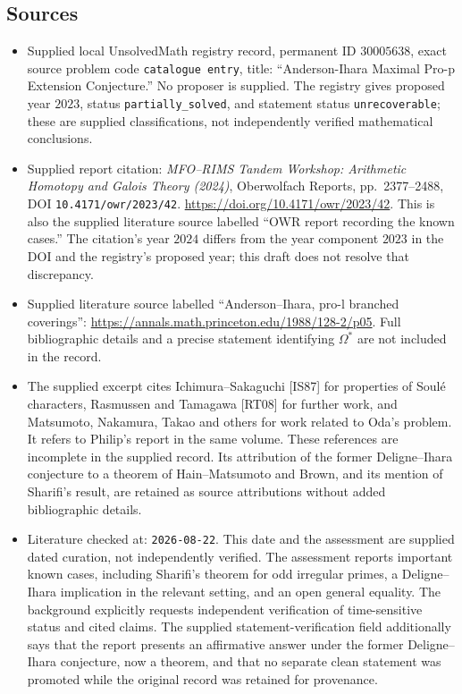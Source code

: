 \documentclass[11pt]{article}
\begin{document}
\subsection{Sources}
\begin{itemize}
\item Supplied local UnsolvedMath registry record, permanent ID \(30005638\), exact source problem code \texttt{catalogue entry}, title: ``Anderson-Ihara Maximal Pro-p Extension Conjecture.'' No proposer is supplied. The registry gives proposed year \(2023\), status \texttt{partially\_solved}, and statement status \texttt{unrecoverable}; these are supplied classifications, not independently verified mathematical conclusions.
\item Supplied report citation: \emph{MFO--RIMS Tandem Workshop: Arithmetic Homotopy and Galois Theory (2024)}, Oberwolfach Reports, pp.\ 2377--2488, DOI \texttt{10.4171/owr/2023/42}. \url{https://doi.org/10.4171/owr/2023/42}. This is also the supplied literature source labelled ``OWR report recording the known cases.'' The citation's year \(2024\) differs from the year component \(2023\) in the DOI and the registry's proposed year; this draft does not resolve that discrepancy.
\item Supplied literature source labelled ``Anderson--Ihara, pro-l branched coverings'': \url{https://annals.math.princeton.edu/1988/128-2/p05}. Full bibliographic details and a precise statement identifying \(\Omega^{*}\) are not included in the record.
\item The supplied excerpt cites Ichimura--Sakaguchi [IS87] for properties of Soul\'e characters, Rasmussen and Tamagawa [RT08] for further work, and Matsumoto, Nakamura, Takao and others for work related to Oda's problem. It refers to Philip's report in the same volume. These references are incomplete in the supplied record. Its attribution of the former Deligne--Ihara conjecture to a theorem of Hain--Matsumoto and Brown, and its mention of Sharifi's result, are retained as source attributions without added bibliographic details.
\item Literature checked at: \texttt{2026-08-22}. This date and the assessment are supplied dated curation, not independently verified. The assessment reports important known cases, including Sharifi's theorem for odd irregular primes, a Deligne--Ihara implication in the relevant setting, and an open general equality. The background explicitly requests independent verification of time-sensitive status and cited claims. The supplied statement-verification field additionally says that the report presents an affirmative answer under the former Deligne--Ihara conjecture, now a theorem, and that no separate clean statement was promoted while the original record was retained for provenance.
\end{itemize}
\end{document}
